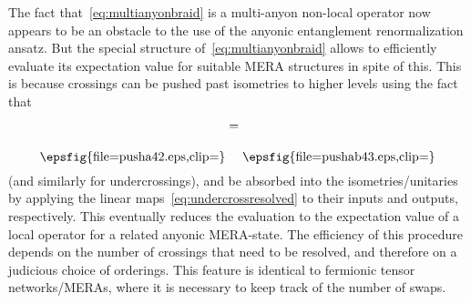 \documentclass[floats,prb,twocolumn]{revtex4}
\newcommand*{\pusha}{\raisebox{-24.663pt}{\epsfig{file=pusha42.eps,clip=}}}
\newcommand*{\pushab}{\raisebox{-24.663pt}{\epsfig{file=pushab43.eps,clip=}}}
\begin{document}
 The fact that~\eqref{eq:multianyonbraid} is a multi-anyon non-local operator now appears to be an obstacle to the use of the anyonic entanglement renormalization ansatz.  But the special structure of~\eqref{eq:multianyonbraid} allows to efficiently evaluate its expectation value for suitable MERA structures in spite of this. This is because crossings can be pushed past isometries to higher levels using the fact that
\begin{align*}
\pusha=\pushab
\end{align*}
(and similarly for undercrossings), and be absorbed into the isometries/unitaries by applying the linear maps~\eqref{eq:undercrossresolved} to their inputs and outputs, respectively. This eventually reduces the evaluation to the expectation value of a local operator for a related anyonic MERA-state.   The efficiency of this procedure depends on the number of crossings that need to be resolved, and therefore on a judicious choice of orderings. This feature is identical to fermionic tensor networks/MERAs, where it is necessary to keep track of the number of swaps. 





 

%
\end{document}
